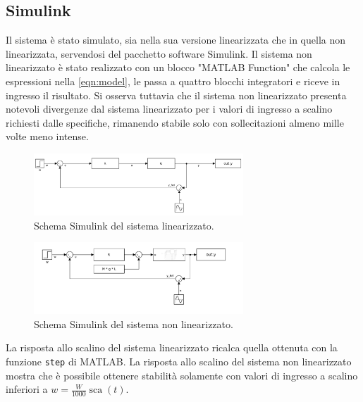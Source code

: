 \documentclass[a4paper]{article}
\DeclareMathOperator*{\sca}{\textrm{sca}}
\begin{document}
\subsection{Simulink}
Il sistema è stato simulato, sia nella sua versione linearizzata che in quella non linearizzata, servendosi del pacchetto software Simulink.
Il sistema non linearizzato è stato realizzato con un blocco "MATLAB Function" che calcola le espressioni nella \cref{eqn:model}, le passa a quattro blocchi integratori e riceve in ingresso il risultato.
Si osserva tuttavia che il sistema non linearizzato presenta notevoli divergenze dal sistema linearizzato per i valori di ingresso a scalino richiesti dalle specifiche, rimanendo stabile solo con sollecitazioni almeno mille volte meno intense.
\begin{figure}[h!]
    \centering
    \includegraphics[width=0.7\textwidth]{Simul1C.pdf}
    \caption{Schema Simulink del sistema linearizzato.}
    \label{fig:sim_lin}
\end{figure}
\begin{figure}[h!]
    \centering
    \includegraphics[width=0.7\textwidth]{NonLin1C.pdf}
    \caption{Schema Simulink del sistema non linearizzato. }
    \label{fig:sim_nonlin}
\end{figure}
La risposta allo scalino del sistema linearizzato ricalca quella ottenuta con la funzione \texttt{step} di MATLAB.
La risposta allo scalino del sistema non linearizzato mostra che è possibile ottenere stabilità solamente con valori di ingresso a scalino inferiori a $w = \frac{W}{1000} \sca(t)$.
\end{document}

